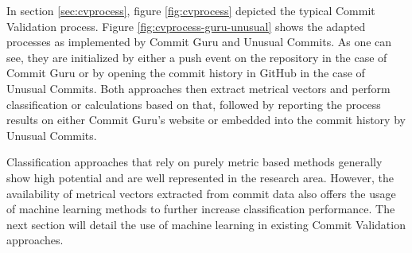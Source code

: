 In section \ref{sec:cvprocess}, figure \ref{fig:cvprocess} depicted the typical Commit Validation process. Figure \ref{fig:cvprocess-guru-unusual} shows the adapted processes as implemented by Commit Guru and Unusual Commits. As one can see, they are initialized by either a push event on the repository in the case of Commit Guru or by opening the commit history in GitHub in the case of Unusual Commits. Both approaches then extract metrical vectors and perform classification or calculations based on that, followed by reporting the process results on either Commit Guru's website or embedded into the commit history by Unusual Commits.

Classification approaches that rely on purely metric based methods generally show high potential and are well represented in the research area. However, the availability of metrical vectors extracted from commit data also offers the usage of machine learning methods to further increase classification performance. The next section will detail the use of machine learning in existing Commit Validation approaches.

